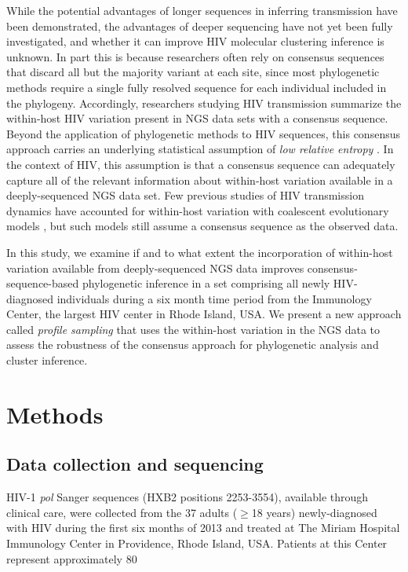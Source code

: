 \documentclass[letterpaper]{article}
\begin{document}
While the potential advantages of longer sequences in inferring transmission have been demonstrated, the advantages of deeper sequencing have not yet been fully investigated, and whether it can improve HIV molecular clustering inference is unknown. In part this is because researchers often rely on consensus sequences that discard all but the majority variant at each site, since most phylogenetic methods require a single fully resolved sequence for each individual included in the phylogeny. Accordingly, researchers studying HIV transmission summarize the within-host HIV variation present in NGS data sets with a consensus sequence. Beyond the application of phylogenetic methods to HIV sequences, this consensus approach carries an underlying statistical assumption of \emph{low relative entropy} \parencite{guang}. In the context of HIV, this assumption is that a consensus sequence can adequately capture all of the relevant information about within-host variation available in a deeply-sequenced NGS data set. Few previous studies of HIV transmission dynamics have accounted for within-host variation with coalescent evolutionary models \parencite{giardina, romero-severson}, but such models still assume a consensus sequence as the observed data.

In this study, we examine if and to what extent the incorporation of within-host variation available from deeply-sequenced NGS data improves consensus-sequence-based phylogenetic inference in a set comprising all newly HIV-diagnosed individuals during a six month time period from the Immunology Center, the largest HIV center in Rhode Island, USA. We present a new approach called \emph{profile sampling} that uses the within-host variation in the NGS data to assess the robustness of the consensus approach for phylogenetic analysis and cluster inference.

\section*{Methods}

\subsection*{Data collection and sequencing}

HIV-1 \emph{pol} Sanger sequences (HXB2 positions 2253-3554), available through clinical care, were collected from the 37 adults ($\geq$18 years) newly-diagnosed with HIV during the first six months of 2013 and treated at The Miriam Hospital Immunology Center in Providence, Rhode Island, USA. Patients at this Center represent approximately 80%
\end{document}

